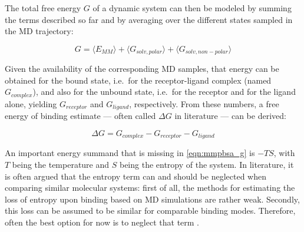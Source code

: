 The total free energy $G$ of a dynamic system can then be modeled by summing the
terms described so far and by averaging over the different states sampled in the
MD trajectory:

\begin{equation}
\label{eqn:mmpbsa_g}
G = \langle E_{MM} \rangle + \langle G_{solv,polar} \rangle + \langle G_{solv,non-polar} \rangle
\end{equation}

Given the availability of the corresponding MD samples, that energy can be
obtained for the bound state, i.e.\ for the receptor-ligand complex (named
$G_{complex}$), and also for the unbound state, i.e.\ for the receptor and for
the ligand alone, yielding $G_{receptor}$ and $G_{ligand}$, respectively. From
these numbers, a free energy of binding estimate --- often called $\Delta G$ in
literature --- can be derived:

\begin{equation}
\Delta G = G_{complex} - G_{receptor} - G_{ligand}
\end{equation}

An important energy summand that is missing in \cref{eqn:mmpbsa_g} is $-TS$,
with $T$ being the temperature and $S$ being the entropy of the system. In
literature, it is often argued that the entropy term can and should be neglected
when comparing similar molecular systems: first of all, the methods for
estimating the loss of entropy upon binding based on MD simulations are rather
weak. Secondly, this loss can be assumed to be similar for comparable binding
modes. Therefore, often the best option for now is to neglect that term
\cite{ryde_mmpbsa_2006, homeyer_gohlke_2012}.

